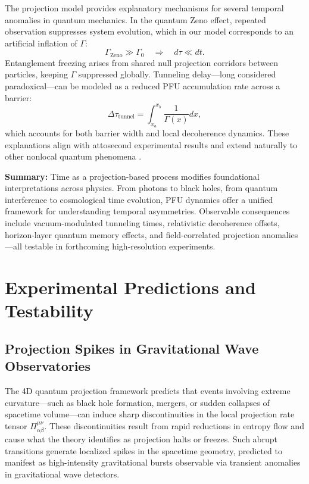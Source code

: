 \documentclass[12pt,a4paper]{article}
\numberwithin{equation}{section}
\begin{document}
The projection model provides explanatory mechanisms for several temporal anomalies in quantum mechanics. In the quantum Zeno effect, repeated observation suppresses system evolution, which in our model corresponds to an artificial inflation of $\Gamma$:
\begin{equation}
\label{eq:zeno_pfu}
\Gamma_{\text{Zeno}} \gg \Gamma_0 \quad \Rightarrow \quad d\tau \ll dt.
\end{equation}
Entanglement freezing arises from shared null projection corridors between particles, keeping $\Gamma$ suppressed globally. Tunneling delay—long considered paradoxical—can be modeled as a reduced PFU accumulation rate across a barrier:
\begin{equation}
\label{eq:tunnel_time}
\Delta \tau_{\text{tunnel}} = \int_{x_a}^{x_b} \frac{1}{\Gamma(x)} dx,
\end{equation}
which accounts for both barrier width and local decoherence dynamics. These explanations align with attosecond experimental results and extend naturally to other nonlocal quantum phenomena \cite{landsman_attosecond_2014}.

\vspace{0.5cm}
\noindent\textbf{Summary:}  
Time as a projection-based process modifies foundational interpretations across physics. From photons to black holes, from quantum interference to cosmological time evolution, PFU dynamics offer a unified framework for understanding temporal asymmetries. Observable consequences include vacuum-modulated tunneling times, relativistic decoherence offsets, horizon-layer quantum memory effects, and field-correlated projection anomalies—all testable in forthcoming high-resolution experiments.



\section{Experimental Predictions and Testability}
\label{sec:experiments}

\subsection{Projection Spikes in Gravitational Wave Observatories}

The 4D quantum projection framework predicts that events involving extreme curvature—such as black hole formation, mergers, or sudden collapses of spacetime volume—can induce sharp discontinuities in the local projection rate tensor \(\Pi^{\mu\nu}_{\alpha\beta}\). These discontinuities result from rapid reductions in entropy flow and cause what the theory identifies as projection halts or freezes. Such abrupt transitions generate localized spikes in the spacetime geometry, predicted to manifest as high-intensity gravitational bursts observable via transient anomalies in gravitational wave detectors.
\end{document}
